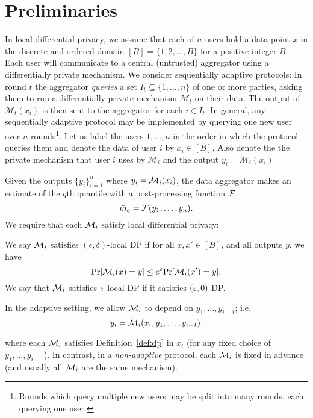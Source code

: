 \section{Preliminaries}\label{sec:preliminaries}
In local differential privacy, we assume that each of $n$ users hold a data point $x$ in the discrete and ordered domain $[B]= \{1, 2, \ldots, B\}$ for a positive integer $B$.
Each user will communicate to a central (untrusted) aggregator using a differentially private mechanism. We consider sequentially adaptive protocols: In round $t$ the aggregator \emph{queries} a set $I_t\subseteq \{1,\dots,n\}$ of one or more parties, asking them to run a differentially private mechanism $\mathcal{M}_t$ on their data.
The output of $\mathcal{M}_t(x_i)$ is then sent to the aggregator for each $i\in I_t$. In general, any sequentially adaptive protocol may be implemented by querying one new user over $n$ rounds\footnote{Rounds which query multiple new users may be split into many rounds, each querying one user.}. Let us label the users $1,\dots,n$ in the order in which the protocol queries them and denote the data of user $i$ by $x_i\in [B]$. Also denote the the private mechanism that user $i$ uses by $\mathcal{M}_i$ and the output $y_i=\mathcal{M}_i(x_i)$

Given the outputs $\{y_i\}_{i=1}^n$ where $y_i = \mathcal{M}_i(x_i)$, the data aggregator makes an estimate of the $q$th quantile with a post-processing function $\mathcal{F}$:
\[
    \tilde{m}_q = \mathcal{F}(y_1, \ldots, y_n).
\]
We require that each $\mathcal{M}_i$ satisfy local differential privacy:
\begin{definition}\label{def:dp}
    We say $\mathcal{M}_i$ satisfies $(\epsilon,\delta)$-local DP if for all $x, x' \in [B]$, and all outputs $y$, we have
    \[
        \textnormal{Pr}[\mathcal{M}_i(x) = y] \leq e^\varepsilon \textnormal{Pr}[\mathcal{M}_i(x') = y].
    \]
    We say that $\mathcal{M}_i$ satisfies $\varepsilon$-local DP if it satisfies $(\varepsilon,0)$-DP.
\end{definition}
%
In the adaptive setting, we allow $\mathcal{M}_i$ to depend on $y_1, \ldots, y_{i-1}$; i.e.
\begin{equation}\label{eq:sequential-interaction}
y_i = \mathcal{M}_i(x_i, y_1, \ldots, y_{i-1}).
\end{equation}


where each $\mathcal{M}_i$ satisfies Definition~\ref{def:dp} in $x_i$ (for any fixed choice of $y_1, \ldots, y_{i-1}$). In contrast, in a \emph{non-adaptive} protocol, each $\mathcal{M}_i$ is fixed in advance (and usually all $\mathcal{M}_i$ are the same mechanism).

